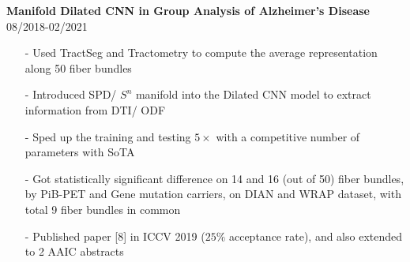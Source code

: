 \documentclass[margin]{res}
\begin{document}
\begin{resume}

                \textbf{Manifold Dilated CNN in Group Analysis of Alzheimer's Disease} \hfill 08/2018-02/2021
                \begin{itemize}\itemsep -2.2pt %
                 \item[-] Used TractSeg and Tractometry to compute the average representation along 50 fiber bundles
                 \item[-] Introduced SPD/ $S^n$ manifold into the Dilated CNN model to extract information from DTI/ ODF
                 \item[-] Sped up the training and testing $5\times$ with a competitive number of parameters with SoTA
                 \item[-] Got statistically significant difference on 14 and 16 (out of 50) fiber bundles, by PiB-PET and Gene mutation carriers, on DIAN and WRAP dataset, with total 9 fiber bundles in common
                 \item[-] Published paper [8] in ICCV 2019 ($25\%$ acceptance rate), and also extended to 2 AAIC abstracts
                 \end{itemize}

%


\end{resume}
\end{document}
